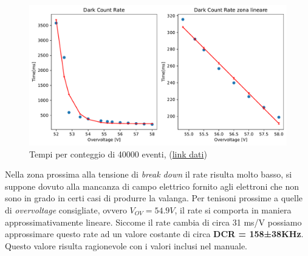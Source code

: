 \begin{figure}[!h]
    \centering
    \includegraphics[width=0.6\linewidth]{assets/SiPm/SiPm_DCR.pdf}
    \caption{Tempi per conteggio di 40000 eventi, (\href{https://github.com/Yedi278/Esperimentazioni-Elettronica/tree/main/SiPm/Caratterizzazione\%20Hamamatsu}{link dati})}
\end{figure}

Nella zona prossima alla tensione di \textit{break down} il rate risulta molto basso, si suppone dovuto alla mancanza di campo elettrico fornito agli elettroni che non sono in grado in certi casi di produrre la valanga. Per tenisoni prossime a quelle di \textit{overvoltage} consigliate, ovvero $V_{OV} = 54.9V$, il rate si comporta in maniera approssimativamente lineare. Siccome il rate cambia di circa 31 ms/V possiamo approssimare questo rate ad un valore costante di circa \textbf{DCR = 158±38KHz}.
Questo valore risulta ragionevole con i valori inclusi nel manuale.